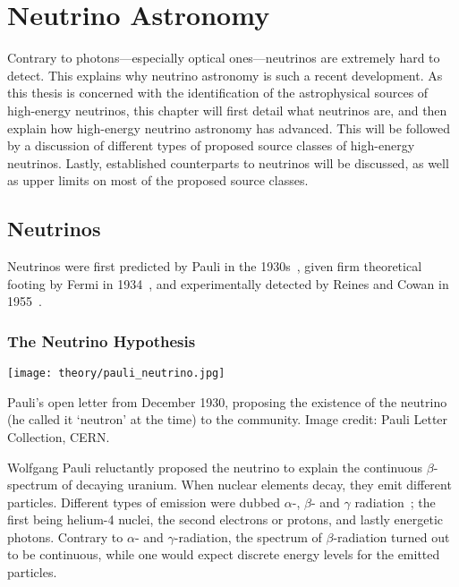 \chapter{Neutrino Astronomy}\label{theory}

Contrary to photons---especially optical ones---neutrinos are extremely hard to detect. This explains why neutrino astronomy is such a recent development. As this thesis is concerned with the identification of the astrophysical sources of high-energy neutrinos, this chapter will first detail what neutrinos are, and then explain how high-energy neutrino astronomy has advanced. This will be followed by a discussion of different types of proposed source classes of high-energy neutrinos. Lastly, established counterparts to neutrinos will be discussed, as well as upper limits on most of the proposed source classes.

\section{Neutrinos}
Neutrinos were first predicted by Pauli in the 1930s~, given firm theoretical footing by Fermi in 1934~, and experimentally detected by Reines and Cowan in 1955~.

\subsection{The Neutrino Hypothesis}\label{neutrino_hypothesis}

\begin{marginfigure}
  \texttt{[image: theory/pauli\_neutrino.jpg]}
  \caption[Pauli's letter proposing the neutrino]{Pauli's open letter from December 1930, proposing the existence of the neutrino (he called it `neutron' at the time) to the community. Image credit: Pauli Letter Collection, CERN.}
\end{marginfigure}

Wolfgang Pauli reluctantly proposed the neutrino to explain the continuous $\beta$-spectrum of decaying uranium. When nuclear elements decay, they emit different particles. Different types of emission were dubbed $\alpha$-, $\beta$- and $\gamma$ radiation~; the first being helium-4 nuclei, the second electrons or protons, and lastly energetic photons. Contrary to $\alpha$- and $\gamma$-radiation, the spectrum of $\beta$-radiation turned out to be continuous, while one would expect discrete energy levels for the emitted particles.

